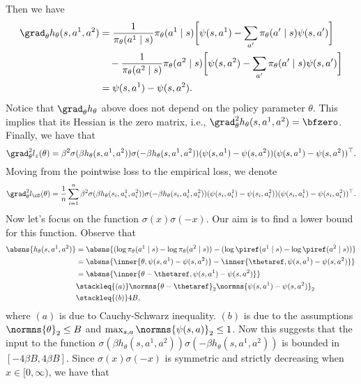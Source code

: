 Then we have
\begin{align}\label{eq:grad-h-func-calculated}
    \grad_\theta h_\theta(s,a^1,a^2) &= \frac{1}{\pi_\theta(a^1\mid s)}\pi_\theta(a^1\mid s)\bigg[\psi(s,a^1) -\sum_{a'}\pi_\theta(a'\mid s)\psi(s,a')\bigg] \nonumber\\
    &\quad - \frac{1}{\pi_\theta(a^2\mid s)}\pi_\theta(a^2\mid s)\bigg[\psi(s,a^2)-\sum_{a'}\pi_\theta(a'\mid s)\psi(s,a')\bigg]  \nonumber\\
    &= \psi(s,a^1) - \psi(s,a^2).
\end{align}
Notice that $\grad_\theta h_\theta$ above does not depend on the policy parameter $\theta$. This implies that its Hessian is the zero matrix, i.e., $\grad_\theta^2 h_\theta(s,a^1,a^2) = \bfzero$. Finally, we have that
\begin{equation*}
    \grad_\theta^2 l_z(\theta) =  \beta^2\sigma(\beta h_\theta(s,a^1,a^2))\sigma(-\beta h_\theta(s,a^1,a^2))  (\psi(s,a^1) - \psi(s,a^2))(\psi(s,a^1) - \psi(s,a^2))^{\top}.
\end{equation*}
Moving from the pointwise loss to the empirical loss, we denote
\begin{equation*}
    \grad_\theta^2 l_{\cD}(\theta) =  \frac{1}{n}\sum_{i=1}^n \beta^2\sigma(\beta h_\theta(s_i,a^1_i,a^2_i))\sigma(-\beta h_\theta(s_i,a^1_i,a^2_i))  (\psi(s_i,a^1_i) - \psi(s_i,a^2_i))(\psi(s_i,a^1_i) - \psi(s_i,a^2_i))^{\top}.
\end{equation*}
Now let's focus on the function $\sigma(x)\sigma(-x)$. Our aim is to find a lower bound for this function. Observe that
\begin{align}
    \absns{h_\theta(s,a^1,a^2)} &= \absns{(\log\pi_\theta(a^1\mid s) - \log\pi_\theta(a^2\mid s)) - (\log\piref(a^1\mid s) - \log\piref(a^2\mid s))} \nonumber\\
    &= \absns{\inner{\theta, \psi(s,a^1)-\psi(s,a^2)} - \inner{\thetaref, \psi(s,a^1)-\psi(s,a^2)}} \nonumber\\
    &= \absns{\inner{\theta-\thetaref, \psi(s,a^1)-\psi(s,a^2)}} \nonumber\\
    &\stackleq{(a)} \normns{\theta-\thetaref}_2 \normns{\psi(s,a^1)-\psi(s,a^2)}_2 \nonumber \\
    &\stackleq{(b)} 4B\label{eq:h-function-bounds},
\end{align}
where $(a)$ is due to Cauchy-Schwarz inequality. $(b)$ is due to the assumptions $\normns{\theta}_2\leq B$ and $\max_{s,a}\normns{\psi(s,a)}_2\leq 1$. Now this suggests that the input to the function $\sigma(\beta h_\theta(s,a^1,a^2))\sigma(-\beta h_\theta(s,a^1,a^2))$ is bounded in $[-4\beta B,4\beta B]$. Since $\sigma(x)\sigma(-x)$ is symmetric and strictly decreasing when $x\in[0,\infty)$, we have that
